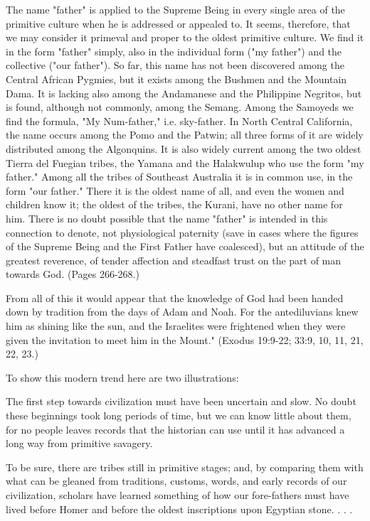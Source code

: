 The name "father" is applied to the Supreme Being in every single area of the primitive
culture when he is addressed or appealed to. It seems, therefore, that we may consider it
primeval and proper to the oldest primitive culture. We find it in the form "father" simply,
also in the individual form ("my father") and the collective ("our father"). So far, this name
has not been discovered among the Central African Pygmies, but it exists among the
Bushmen and the Mountain Dama. It is lacking also among the Andamanese and the
Philippine Negritos, but is found, although not commonly, among the Semang. Among the
Samoyeds we find the formula, "My Num-father," i.e. sky-father. In North Central
California, the name occurs among the Pomo and the Patwin; all three forms of it are widely
distributed among the Algonquins. It is also widely current among the two oldest Tierra del
Fuegian tribes, the Yamana and the Halakwulup who use the form "my father." Among all
the tribes of Southeast Australia it is in common use, in the form "our father." There it is the
oldest name of all, and even the women and children know it; the oldest of the tribes, the
Kurani, have no other name for him. There is no doubt possible that the name "father" is
intended in this connection to denote, not physiological paternity (save in cases where the
figures of the Supreme Being and the First Father have coalesced), but an attitude of the
greatest reverence, of tender affection and steadfast trust on the part of man towards God.
(Pages 266-268.)

From all of this it would appear that the knowledge of God had been handed down by
tradition from the days of Adam and Noah. For the antediluvians knew him as shining like
the sun, and the Israelites were frightened when they were given the invitation to meet him in
the Mount." (Exodus 19:9-22; 33:9, 10, 11, 21, 22, 23.)

To show this modern trend here are two illustrations:

The first step towards civilization must have been uncertain and slow. No doubt these
beginnings took long periods of time, but we can know little about them, for no people leaves
records that the historian can use until it has advanced a long way from primitive savagery.

To be sure, there are tribes still in primitive stages; and, by comparing them with what can be
gleaned from traditions, customs, words, and early records of our civilization, scholars have
learned something of how our fore-fathers must have lived before Homer and before the
oldest inscriptions upon Egyptian stone. . . .


